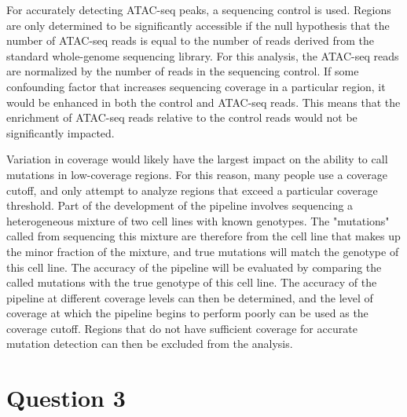 For accurately detecting ATAC-seq peaks, a sequencing control is used.
Regions are only determined to be significantly accessible if the null hypothesis that the number of ATAC-seq reads is equal to the number of reads derived from the standard whole-genome sequencing library.
For this analysis, the ATAC-seq reads are normalized by the number of reads in the sequencing control.
If some confounding factor that increases sequencing coverage in a particular region, it would be enhanced in both the control and ATAC-seq reads. This means that the enrichment of ATAC-seq reads relative to the control reads would not be significantly impacted.

Variation in coverage would likely have the largest impact on the ability to call mutations in low-coverage regions. For this reason, many people use a coverage cutoff, and only attempt to analyze regions that exceed a particular coverage threshold. Part of the development of the pipeline involves sequencing a heterogeneous mixture of two cell lines with known genotypes. The "mutations" called from sequencing this mixture are therefore from the cell line that makes up the minor fraction of the mixture, and true mutations will match the genotype of this cell line. The accuracy of the pipeline will be evaluated by comparing the called mutations with the true genotype of this cell line. The accuracy of the pipeline at different coverage levels can then be determined, and the level of coverage at which the pipeline begins to perform poorly can be used as the coverage cutoff. Regions that do not have sufficient coverage for accurate mutation detection can then be excluded from the analysis.


\section{Question 3}





